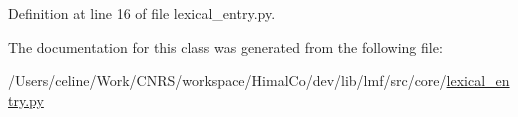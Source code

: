 Definition at line 16 of file lexical\+\_\+entry.\+py.



The documentation for this class was generated from the following file\+:\begin{DoxyCompactItemize}
\item 
/\+Users/celine/\+Work/\+C\+N\+R\+S/workspace/\+Himal\+Co/dev/lib/lmf/src/core/\hyperlink{lexical__entry_8py}{lexical\+\_\+entry.\+py}\end{DoxyCompactItemize}
